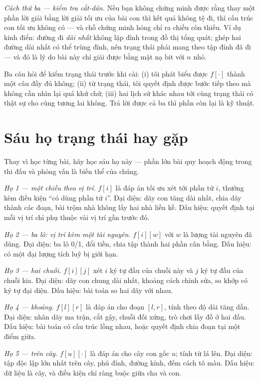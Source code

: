 \documentclass[../../algorithm.tex]{subfiles}
\begin{document}
\emph{Cách thứ ba --- kiểm tra cắt-dán.} Nếu bạn không chứng minh được rằng thay một phần lời giải bằng lời giải tối ưu của bài con thì kết quả không tệ đi, thì cấu trúc con tối ưu không có --- và chỗ chứng minh hỏng chỉ ra chiều còn thiếu. Ví dụ kinh điển: đường đi \emph{dài nhất} không lặp đỉnh trong đồ thị tổng quát; ghép hai đường dài nhất có thể trùng đỉnh, nên trạng thái phải mang theo tập đỉnh đã đi --- và đó là lý do bài này chỉ giải được bằng mặt nạ bit với \(n\) nhỏ.

\begin{cannho}
Ba câu hỏi để kiểm trạng thái trước khi cài: (i) tôi phát biểu được \(f[\cdot]\) thành một câu đầy đủ không; (ii) từ trạng thái, tôi quyết định được bước tiếp theo mà không cần nhìn lại quá khứ chứ; (iii) hai lịch sử khác nhau tới cùng trạng thái có thật sự cho cùng tương lai không. Trả lời được cả ba thì phần còn lại là kỹ thuật.
\end{cannho}

\section{Sáu họ trạng thái hay gặp}

Thay vì học từng bài, hãy học sáu họ này --- phần lớn bài quy hoạch động trong thi đấu và phỏng vấn là biến thể của chúng.

\emph{Họ 1 --- một chiều theo vị trí.} \(f[i]\) là đáp án tối ưu xét tới phần tử \(i\), thường kèm điều kiện ``có dùng phần tử \(i\)''. Đại diện: dãy con tăng dài nhất, chia dãy thành các đoạn, bài trộm nhà không lấy hai nhà liền kề. Dấu hiệu: quyết định tại mỗi vị trí chỉ phụ thuộc vài vị trí gần trước đó.

\emph{Họ 2 --- ba lô: vị trí kèm một tài nguyên.} \(f[i][w]\) với \(w\) là lượng tài nguyên đã dùng. Đại diện: ba lô 0/1, đổi tiền, chia tập thành hai phần cân bằng. Dấu hiệu: có một đại lượng tích luỹ bị giới hạn.

\emph{Họ 3 --- hai chuỗi.} \(f[i][j]\) xét \(i\) ký tự đầu của chuỗi này và \(j\) ký tự đầu của chuỗi kia. Đại diện: dãy con chung dài nhất, khoảng cách chỉnh sửa, so khớp có ký tự đại diện. Dấu hiệu: bài toán so hai dãy với nhau.

\emph{Họ 4 --- khoảng.} \(f[l][r]\) là đáp án cho đoạn \([l,r]\), tính theo độ dài tăng dần. Đại diện: nhân dãy ma trận, cắt gậy, chuỗi đối xứng, trò chơi lấy đồ ở hai đầu. Dấu hiệu: bài toán có cấu trúc lồng nhau, hoặc quyết định chia đoạn tại một điểm giữa.

\emph{Họ 5 --- trên cây.} \(f[u][\cdot]\) là đáp án cho cây con gốc \(u\); tính từ lá lên. Đại diện: tập độc lập lớn nhất trên cây, phủ đỉnh, đường kính, đếm cách tô màu. Dấu hiệu: dữ liệu là cây, và điều kiện chỉ ràng buộc giữa cha và con.
\end{document}

